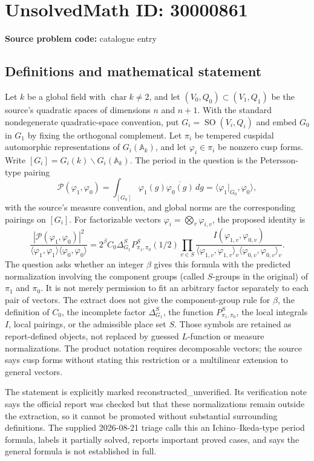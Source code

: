 \documentclass[11pt]{article}
\begin{document}
\section*{UnsolvedMath ID: 30000861}
\textbf{Source problem code:} catalogue entry
\subsection{Definitions and mathematical statement}
Let $k$ be a global field with $\operatorname{char}k\ne2$, and let $(V_0,Q_0)\subset(V_1,Q_1)$ be the source's quadratic spaces of dimensions $n$ and $n+1$. With the standard nondegenerate quadratic-space convention, put $G_i=\operatorname{SO}(V_i,Q_i)$ and embed $G_0$ in $G_1$ by fixing the orthogonal complement. Let $\pi_i$ be tempered cuspidal automorphic representations of $G_i(\mathbb A_k)$, and let $\varphi_i\in\pi_i$ be nonzero cusp forms. Write $[G_i]=G_i(k)\backslash G_i(\mathbb A_k)$. The period in the question is the Petersson-type pairing \[\mathcal P(\varphi_1,\varphi_0)=\int_{[G_0]}\varphi_1(g)\overline{\varphi_0(g)}\,dg=\langle\varphi_1|_{G_0},\varphi_0\rangle,\] with the source's measure convention, and global norms are the corresponding pairings on $[G_i]$. For factorizable vectors $\varphi_i=\bigotimes_v\varphi_{i,v}$, the proposed identity is \[\frac{|\mathcal P(\varphi_1,\varphi_0)|^2}{\langle\varphi_1,\varphi_1\rangle\langle\varphi_0,\varphi_0\rangle}=2^\beta C_0\Delta_{G_1}^S P_{\pi_1,\pi_0}^S(1/2)\prod_{v\in S}\frac{I(\varphi_{1,v},\varphi_{0,v})}{\langle\varphi_{1,v},\varphi_{1,v}\rangle_v\langle\varphi_{0,v},\varphi_{0,v}\rangle_v}.\] The question asks whether an integer $\beta$ gives this formula with the predicted normalization involving the component groups (called $S$-groups in the original) of $\pi_1$ and $\pi_0$. It is not merely permission to fit an arbitrary factor separately to each pair of vectors. The extract does not give the component-group rule for $\beta$, the definition of $C_0$, the incomplete factor $\Delta_{G_1}^S$, the function $P_{\pi_1,\pi_0}^S$, the local integrals $I$, local pairings, or the admissible place set $S$. Those symbols are retained as report-defined objects, not replaced by guessed $L$-function or measure normalizations. The product notation requires decomposable vectors; the source says cusp forms without stating this restriction or a multilinear extension to general vectors.\par The statement is explicitly marked reconstructed\_unverified. Its verification note says the official report was checked but that these normalizations remain outside the extraction, so it cannot be promoted without substantial surrounding definitions. The supplied 2026-08-21 triage calls this an Ichino--Ikeda-type period formula, labels it partially solved, reports important proved cases, and says the general formula is not established in full.
\end{document}
